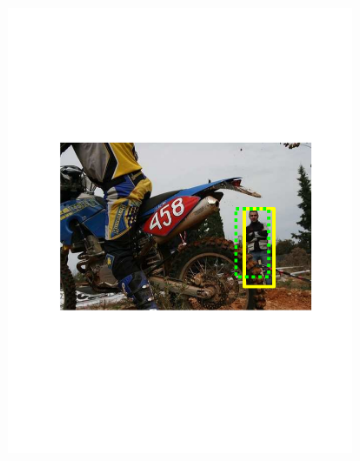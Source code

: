 \begin{figure}[hbt]
\begin{subfigure}[b]{0.45\textwidth}
        \includegraphics[width=\textwidth]{TP30971}
        \caption{}
        \label{fig:dettn2}
    \end{subfigure}
    

\end{figure}
